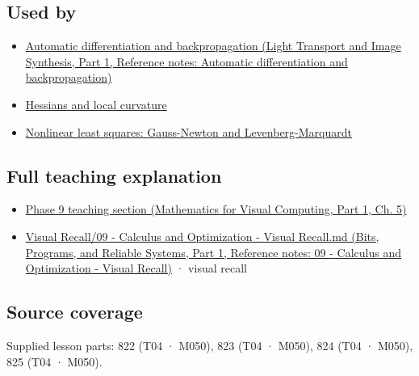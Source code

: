 \subsection{Used by}\label{appendix-d8a7ddb675eb-used-by}

\hypertarget{appendix-d8a7ddb675eb-used-by}{}

\begin{itemize}
\tightlist
\item
  \href{../04-Light-Transport-and-Image-Synthesis-P01/main.pdf\#nameddest=appendix-40df0855b4a7}{Automatic differentiation and backpropagation (Light Transport and Image Synthesis, Part 1, Reference notes: Automatic differentiation and backpropagation)}
\item
  \hyperref[appendix-6ac071f8b50c]{Hessians and local curvature}
\item
  \hyperref[appendix-2c2df8345991]{Nonlinear least squares: Gauss-Newton and Levenberg-Marquardt}
\end{itemize}

\subsection{Full teaching explanation}\label{appendix-d8a7ddb675eb-full-teaching-explanation}

\hypertarget{appendix-d8a7ddb675eb-full-teaching-explanation}{}

\begin{itemize}
\tightlist
\item
  \href{../02-Mathematics-for-Visual-Computing-P01/main.pdf\#nameddest=02-foundations-ii-ch021-jacobians-curvature-and-local-approximation}{Phase 9 teaching section (Mathematics for Visual Computing, Part 1, Ch. 5)}
\item
  \href{../01-Bits-Programs-and-Reliable-Systems-P01/main.pdf\#nameddest=appendix-adf48f5dc5c1}{Visual Recall/09 - Calculus and Optimization - Visual Recall.md (Bits, Programs, and Reliable Systems, Part 1, Reference notes: 09 - Calculus and Optimization - Visual Recall)} · visual recall
\end{itemize}

\subsection{Source coverage}\label{appendix-d8a7ddb675eb-source-coverage}

\hypertarget{appendix-d8a7ddb675eb-source-coverage}{}

Supplied lesson parts: 822 (T04 · M050), 823 (T04 · M050), 824 (T04 · M050), 825 (T04 · M050).
